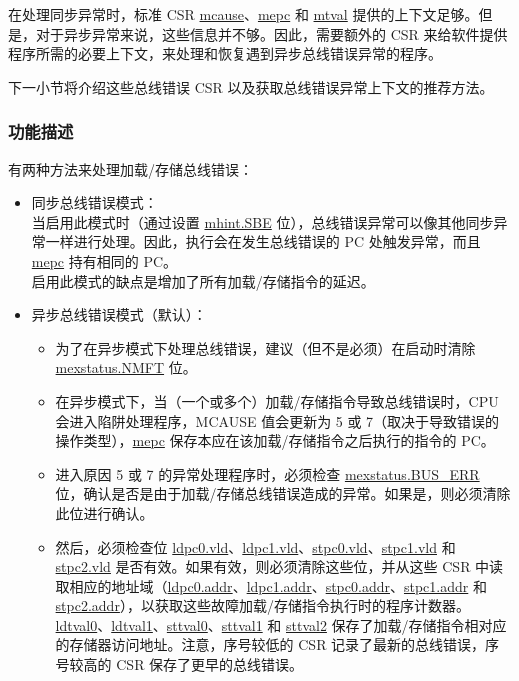 \documentclass[main\_\_CN.tex]{subfiles}
\begin{document}
在处理同步异常时，标准 CSR \hyperref[regdesc:MCAUSE]{mcause}、\hyperref[regdesc:MEPC]{mepc} 和 \hyperref[regdesc:MTVAL]{mtval} 提供的上下文足够。但是，对于异步异常来说，这些信息并不够。因此，需要额外的 CSR 来给软件提供程序所需的必要上下文，来处理和恢复遇到异步总线错误异常的程序。

下一小节将介绍这些总线错误 CSR 以及获取总线错误异常上下文的推荐方法。

\subsubsection{功能描述}
\label{sec:riscvcpu-buserr-func-descr}

有两种方法来处理加载/存储总线错误：

\begin{itemize}
    \item 同步总线错误模式： \\
    当启用此模式时（通过设置 \hyperref[fielddesc:MHINT_SBE]{mhint.SBE} 位），总线错误异常可以像其他同步异常一样进行处理。因此，执行会在发生总线错误的 PC 处触发异常，而且 \hyperref[regdesc:MEPC]{mepc} 持有相同的 PC。\\
    启用此模式的缺点是增加了所有加载/存储指令的延迟。
    \item 异步总线错误模式（默认）：
    \begin{itemize}
    \item 为了在异步模式下处理总线错误，建议（但不是必须）在启动时清除 \hyperref[fielddesc:MEXSTATUS_NMFT]{mexstatus.NMFT} 位。\\
    \item 在异步模式下，当（一个或多个）加载/存储指令导致总线错误时，CPU 会进入陷阱处理程序，MCAUSE 值会更新为 5 或 7（取决于导致错误的操作类型），\hyperref[regdesc:MEPC]{mepc} 保存本应在该加载/存储指令之后执行的指令的 PC。\\
    \item 进入原因 5 或 7 的异常处理程序时，必须检查 \hyperref[fielddesc:MEXSTATUS_BUS_ERR]{mexstatus.BUS\_ERR} 位，确认是否是由于加载/存储总线错误造成的异常。如果是，则必须清除此位进行确认。\\
    \item 然后，必须检查位 \hyperref[fielddesc:LDPC0_VLD]{ldpc0.vld}、\hyperref[fielddesc:LDPC1_VLD]{ldpc1.vld}、\hyperref[fielddesc:STPC0_VLD]{stpc0.vld}、\hyperref[fielddesc:STPC1_VLD]{stpc1.vld} 和 \hyperref[fielddesc:STPC2_VLD]{stpc2.vld} 是否有效。如果有效，则必须清除这些位，并从这些 CSR 中读取相应的地址域（\hyperref[fielddesc:LDPC0_ADDR]{ldpc0.addr}、\hyperref[fielddesc:LDPC1_ADDR]{ldpc1.addr}、\hyperref[fielddesc:STPC0_ADDR]{stpc0.addr}、\hyperref[fielddesc:STPC1_ADDR]{stpc1.addr} 和 \hyperref[fielddesc:STPC2_ADDR]{stpc2.addr}），以获取这些故障加载/存储指令执行时的程序计数器。\hyperref[regdesc:LDTVAL0]{ldtval0}、\hyperref[regdesc:LDTVAL1]{ldtval1}、\hyperref[regdesc:STTVAL0]{sttval0}、\hyperref[regdesc:STTVAL1]{sttval1} 和 \hyperref[regdesc:STTVAL2]{sttval2} 保存了加载/存储指令相对应的存储器访问地址。注意，序号较低的 CSR 记录了最新的总线错误，序号较高的 CSR 保存了更早的总线错误。\\

\end{itemize}
\end{itemize}
\end{document}
